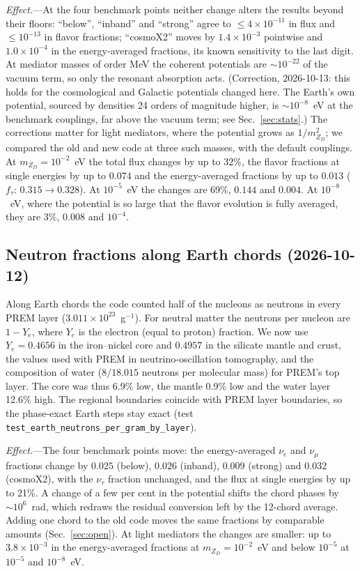 \documentclass[11pt,a4paper]{article}
\newcommand{\file}[1]{\nolinkurl{#1}}
\newcommand{\mzd}{m_{Z_D}}
\begin{document}
\textit{Effect.}---At the four benchmark points neither change alters the results beyond their
floors: ``below'', ``inband'' and ``strong'' agree to $\le4\times10^{-11}$ in flux and
$\le10^{-13}$ in flavor fractions; ``cosmoX2'' moves by $1.4\times10^{-3}$ pointwise and
$1.0\times10^{-4}$ in the energy-averaged fractions, its known sensitivity to the last digit.
At mediator masses of order MeV the coherent potentials are $\sim10^{-22}$ of the vacuum term, so
only the resonant absorption acts. (Correction, 2026-10-13: this holds for the cosmological and
Galactic potentials changed here. The Earth's own potential, sourced by densities 24 orders of
magnitude higher, is $\sim10^{-8}$~eV at the benchmark couplings, far above the vacuum term; see
Sec.~\ref{sec:stats}.) The corrections matter for light mediators, where the
potential grows as $1/\mzd^2$; we compared the old and new code at three such masses, with the
default couplings. At $\mzd = 10^{-2}$~eV the total flux changes by up to 32\%, the flavor
fractions at single energies by up to $0.074$ and the energy-averaged fractions by up to
$0.013$ ($f_\tau$: $0.315\to0.328$). At $10^{-5}$~eV the changes are 69\%, $0.144$ and $0.004$.
At $10^{-8}$~eV, where the potential is so large that the flavor evolution is fully averaged,
they are 3\%, $0.008$ and $10^{-4}$.

\subsection{Neutron fractions along Earth chords (2026-10-12)}
\label{app:earthchords}

Along Earth chords the code counted half of the nucleons as neutrons in every PREM layer
($3.011\times10^{23}$~g$^{-1}$). For neutral matter the neutrons per nucleon are $1-Y_e$, where
$Y_e$ is the electron (equal to proton) fraction. We now use $Y_e = 0.4656$ in the iron--nickel
core and $0.4957$ in the silicate mantle and crust, the values used with PREM in
neutrino-oscillation tomography, and the composition of water ($8/18.015$ neutrons per
molecular mass) for PREM's top layer. The core was thus 6.9\% low, the mantle 0.9\% low and the
water layer 12.6\% high. The regional boundaries coincide with PREM layer boundaries, so the
phase-exact Earth steps stay exact (test \file{test_earth_neutrons_per_gram_by_layer}).

\textit{Effect.}---The four benchmark points move: the energy-averaged $\nu_e$ and $\nu_\mu$
fractions change by $0.025$ (below), $0.026$ (inband), $0.009$ (strong) and $0.032$ (cosmoX2),
with the $\nu_\tau$ fraction unchanged, and the flux at single energies by up to 21\%. A change of
a few per cent in the potential shifts the chord phases by $\sim10^6$~rad, which redraws the
residual conversion left by the 12-chord average. Adding one chord to the old code moves the
same fractions by comparable amounts (Sec.~\ref{sec:open}). At light mediators the changes are
smaller: up to $3.8\times10^{-3}$ in the energy-averaged fractions at $\mzd = 10^{-2}$~eV and
below $10^{-5}$ at $10^{-5}$ and $10^{-8}$~eV.
\end{document}
